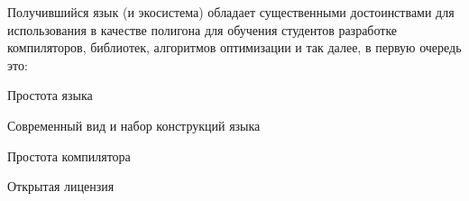 \bigskip
Получившийся язык (и экосистема) обладает существенными достоинствами для использования в качестве полигона для обучения студентов 
разработке компиляторов, библиотек, алгоритмов оптимизации и так далее, в первую очередь это:
\begin{d_itemize}
\item 
    Простота языка
\item 
    Современный вид и набор конструкций языка
\item 
    Простота компилятора
\item 
    Открытая лицензия
\end{d_itemize}

